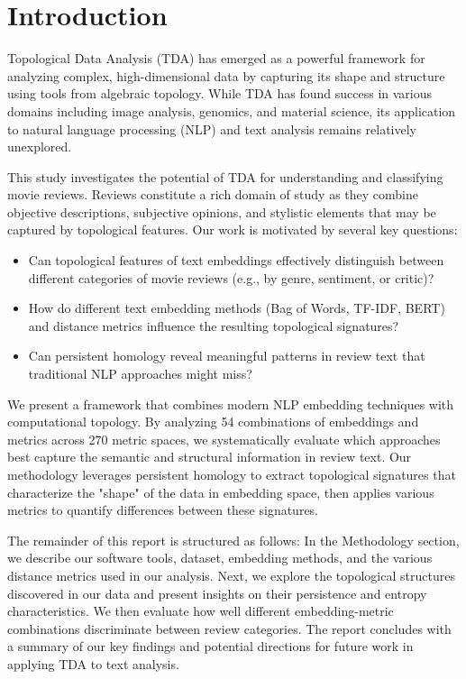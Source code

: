 \documentclass[fleqn,10pt]{SelfArx}
\affiliation{\textsuperscript{1}\textit{Team Bravo}} %
\begin{document}
\maketitle
\tableofcontents %

\section{Introduction}
Topological Data Analysis (TDA) has emerged as a powerful framework for analyzing complex, high-dimensional data by capturing its shape and structure using tools from algebraic topology. While TDA has found success in various domains including image analysis, genomics, and material science, its application to natural language processing (NLP) and text analysis remains relatively unexplored.

This study investigates the potential of TDA for understanding and classifying movie reviews. Reviews constitute a rich domain of study as they combine objective descriptions, subjective opinions, and stylistic elements that may be captured by topological features. Our work is motivated by several key questions:

\begin{itemize}
    \item Can topological features of text embeddings effectively distinguish between different categories of movie reviews (e.g., by genre, sentiment, or critic)?
    \item How do different text embedding methods (Bag of Words, TF-IDF, BERT) and distance metrics influence the resulting topological signatures?
    \item Can persistent homology reveal meaningful patterns in review text that traditional NLP approaches might miss?
\end{itemize}

We present a framework that combines modern NLP embedding techniques with computational topology. By analyzing 54 combinations of embeddings and metrics across 270 metric spaces, we systematically evaluate which approaches best capture the semantic and structural information in review text. Our methodology leverages persistent homology to extract topological signatures that characterize the "shape" of the data in embedding space, then applies various metrics to quantify differences between these signatures.

The remainder of this report is structured as follows: In the Methodology section, we describe our software tools, dataset, embedding methods, and the various distance metrics used in our analysis. Next, we explore the topological structures discovered in our data and present insights on their persistence and entropy characteristics. We then evaluate how well different embedding-metric combinations discriminate between review categories. The report concludes with a summary of our key findings and potential directions for future work in applying TDA to text analysis.
\end{document}
